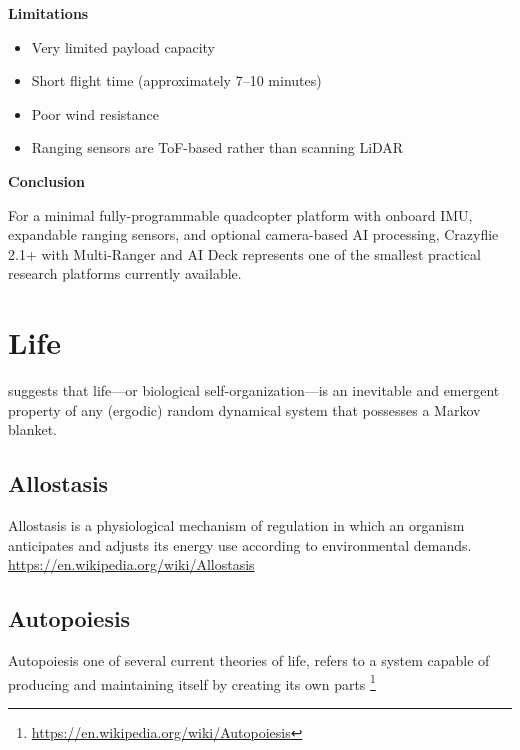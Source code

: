 \documentclass{book}
\providecommand{\ProjectDeepHeading}[2]{%
    \par\medskip\noindent\textbf{#2}\par\smallskip
}
\providecommand{\seeherefooter}[1]{\footnote{\url{#1}}}
\begin{document}
        \ProjectDeepHeading{5}{Limitations}
            
            \begin{itemize}
                \item Very limited payload capacity
                \item Short flight time (approximately 7–10 minutes)
                \item Poor wind resistance
                \item Ranging sensors are ToF-based rather than scanning LiDAR
            \end{itemize}
        
        \ProjectDeepHeading{5}{Conclusion}
            
            For a minimal fully-programmable quadcopter platform with onboard IMU, expandable ranging sensors, and optional camera-based AI processing, Crazyflie 2.1+ with Multi-Ranger and AI Deck represents one of the smallest practical research platforms currently available.

\section{Life}


\cite{friston-2013-life-as-we-know-it} suggests that life—or biological self-organization—is an inevitable and emergent property of any (ergodic) random dynamical system that possesses a Markov blanket.

\subsection{Allostasis}


Allostasis is a physiological mechanism of regulation in which an organism anticipates and adjusts its energy use according to environmental demands. \url{https://en.wikipedia.org/wiki/Allostasis}

\subsection{Autopoiesis}


Autopoiesis one of several current theories of life, refers to a system capable of producing and maintaining itself by creating its own parts
    \seeherefooter{https://en.wikipedia.org/wiki/Autopoiesis}
    
\end{document}
